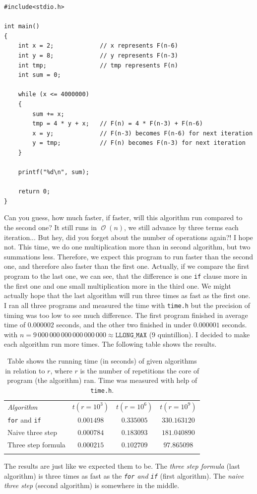 \documentclass{book}
\DeclareMathOperator{\bigo}{\mathcal{O}}
\begin{document}
\begin{verbatim}
#include<stdio.h>

int main()
{
    int x = 2;             // x represents F(n-6)
    int y = 8;             // y represents F(n-3)
    int tmp;               // tmp represents F(n)
    int sum = 0;
    
    while (x <= 4000000)
    {
        sum += x;
        tmp = 4 * y + x;   // F(n) = 4 * F(n-3) + F(n-6)
        x = y;             // F(n-3) becomes F(n-6) for next iteration
        y = tmp;           // F(n) becomes F(n-3) for next iteration
    }
    
    printf("%d\n", sum);
    
    return 0;
}
\end{verbatim}

Can you guess, how much faster, if faster, will this algorithm run compared to the second one? It still runs in $\bigo(n)$, we still advance by three terms each iteration... But hey, did you forget about the number of operations again?! I hope not. This time, we do one multiplication more than in second algorithm, but two summations less. Therefore, we expect this program to run faster than the second one, and therefore also faster than the first one. Actually, if we compare the first program to the last one, we can see, that the difference is one \texttt{if} clause more in the first one and one small multiplication more in the third one. We might actually hope that the last algorithm will run three times as fast as the first one.\\

I ran all three programs and measured the time with \texttt{time.h} but the precision of timing was too low to see much difference. The first program finished in average time of $0.000002$ seconds, and the other two finished in under $0.000001$ seconds. with $n = 9\,000\,000\,000\,000\,000\,000 \approx \texttt{LLONG\_MAX}$ ($9$ quintillion). I decided to make each algorithm run more times. The following table shows the results.

\begin{table}[h!]
\centering
\begin{tabular}{||l||c|c|c||}
\hhline{|t:====:t|}
\textit{Algorithm} & $t(r = 10^3)$ & $t(r = 10^6)$ & $t(r = 10^9)$\\ \hhline{||=||=|=|=||}
\texttt{for} and \texttt{if} & $0.001498$ & $0.335005$ & $330.163120$\\ \hhline{||=||=|=|=||}
Naive three step & $0.000784$ & $0.183093$ & $181.040890$\\ \hhline{||=||=|=|=||}
Three step formula & $0.000215$ & $0.102709$ & $97.865098$\\ \hhline{|b:====:b|}
\end{tabular}
\caption{Table shows the running time (in seconds) of given algorithms in relation to $r$, where $r$ is the number of repetitions the core of program (the algorithm) ran. Time was measured with help of \texttt{time.h}.}
\end{table}

The results are just like we expected them to be. The \textit{three step formula} (last algorithm) is three times as fast as the \textit{\texttt{for} and \texttt{if}} (first algorithm). The \textit{naive three step} (second algorithm) is somewhere in the middle.
\end{document}

